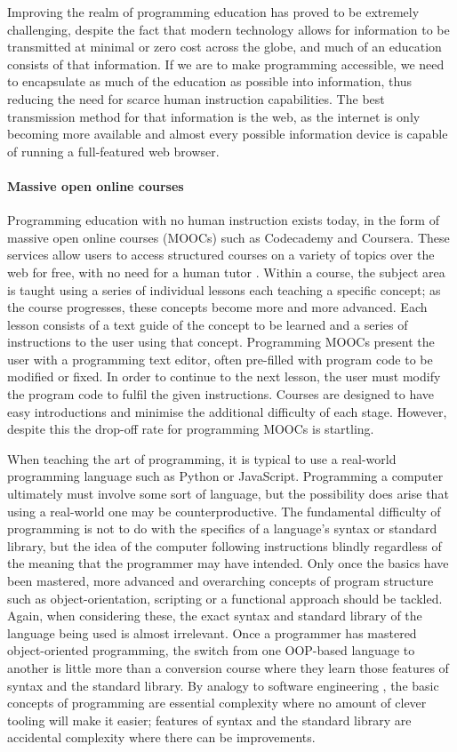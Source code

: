 Improving the realm of programming education has proved to be extremely challenging, despite the fact that modern technology allows for information to be transmitted at minimal or zero cost across the globe, and much of an education consists of that information. If we are to make programming accessible, we need to encapsulate as much of the education as possible into information, thus reducing the need for scarce human instruction capabilities. The best transmission method for that information is the web, as the internet is only becoming more available and almost every possible information device is capable of running a full-featured web browser.

\paragraph{Massive open online courses}
Programming education with no human instruction exists today, in the form of massive open online courses (MOOCs) such as Codecademy and Coursera. These services allow users to access structured courses on a variety of topics over the web for free, with no need for a human tutor \cite{alex229475}. Within a course, the subject area is taught using a series of individual lessons each teaching a specific concept; as the course progresses, these concepts become more and more advanced. Each lesson consists of a text guide of the concept to be learned and a series of instructions to the user using that concept. Programming MOOCs present the user with a programming text editor, often pre-filled with program code to be modified or fixed. In order to continue to the next lesson, the user must modify the program code to fulfil the given instructions. Courses are designed to have easy introductions and minimise the additional difficulty of each stage. However, despite this the drop-off rate for programming MOOCs is startling.

When teaching the art of programming, it is typical to use a real-world programming language such as Python or JavaScript. Programming a computer ultimately must involve some sort of language, but the possibility does arise that using a real-world one may be counterproductive. The fundamental difficulty of programming is not to do with the specifics of a language's syntax or standard library, but the idea of the computer following instructions blindly regardless of the meaning that the programmer may have intended. Only once the basics have been mastered, more advanced and overarching concepts of program structure such as object-orientation, scripting or a functional approach should be tackled. Again, when considering these, the exact syntax and standard library of the language being used is almost irrelevant. Once a programmer has mastered object-oriented programming, the switch from one OOP-based language to another is little more than a conversion course where they learn those features of syntax and the standard library. By analogy to software engineering \cite{brooks1987}, the basic concepts of programming are essential complexity where no amount of clever tooling will make it easier; features of syntax and the standard library are accidental complexity where there can be improvements.

